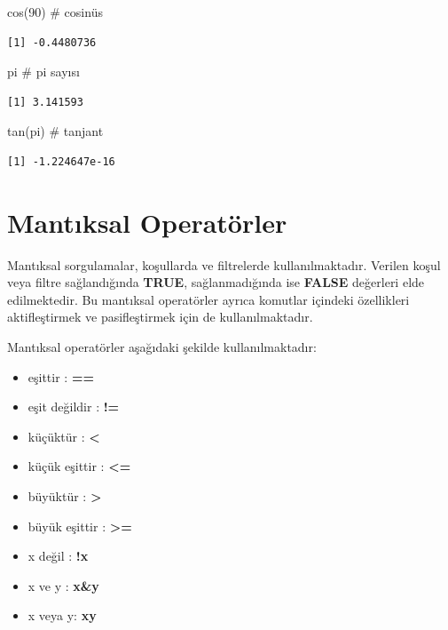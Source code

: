 \documentclass[
  letterpaper,
  DIV=11,
  numbers=noendperiod]{scrreprt}
\newenvironment{Shaded}{\begin{snugshade}}{\end{snugshade}}
\newcommand{\CommentTok}[1]{\textcolor[rgb]{0.37,0.37,0.37}{#1}}
\newcommand{\DecValTok}[1]{\textcolor[rgb]{0.68,0.00,0.00}{#1}}
\newcommand{\FunctionTok}[1]{\textcolor[rgb]{0.28,0.35,0.67}{#1}}
\newcommand{\NormalTok}[1]{\textcolor[rgb]{0.00,0.23,0.31}{#1}}
\begin{document}
\begin{Shaded}
\begin{Highlighting}[]
\FunctionTok{cos}\NormalTok{(}\DecValTok{90}\NormalTok{) }\CommentTok{\# cosinüs }
\end{Highlighting}
\end{Shaded}

\begin{verbatim}
[1] -0.4480736
\end{verbatim}

\begin{Shaded}
\begin{Highlighting}[]
\NormalTok{pi }\CommentTok{\# pi sayısı }
\end{Highlighting}
\end{Shaded}

\begin{verbatim}
[1] 3.141593
\end{verbatim}

\begin{Shaded}
\begin{Highlighting}[]
\FunctionTok{tan}\NormalTok{(pi) }\CommentTok{\# tanjant}
\end{Highlighting}
\end{Shaded}

\begin{verbatim}
[1] -1.224647e-16
\end{verbatim}

\hypertarget{mantux131ksal-operatuxf6rler}{%
\section{Mantıksal Operatörler}\label{mantux131ksal-operatuxf6rler}}

Mantıksal sorgulamalar, koşullarda ve filtrelerde kullanılmaktadır.
Verilen koşul veya filtre sağlandığında \textbf{TRUE}, sağlanmadığında
ise \textbf{FALSE} değerleri elde edilmektedir. Bu mantıksal operatörler
ayrıca komutlar içindeki özellikleri aktifleştirmek ve pasifleştirmek
için de kullanılmaktadır.

Mantıksal operatörler aşağıdaki şekilde kullanılmaktadır:

\begin{itemize}
\item
  eşittir : \textbf{==}
\item
  eşit değildir : \textbf{!=}
\item
  küçüktür : \textbf{\textless{}}
\item
  küçük eşittir : \textbf{\textless=}
\item
  büyüktür : \textbf{\textgreater{}}
\item
  büyük eşittir : \textbf{\textgreater=}
\item
  x değil : \textbf{!x}
\item
  x ve y : \textbf{x\&y}
\item
  x veya y: \textbf{x\textbar y}
\end{itemize}
\end{document}
